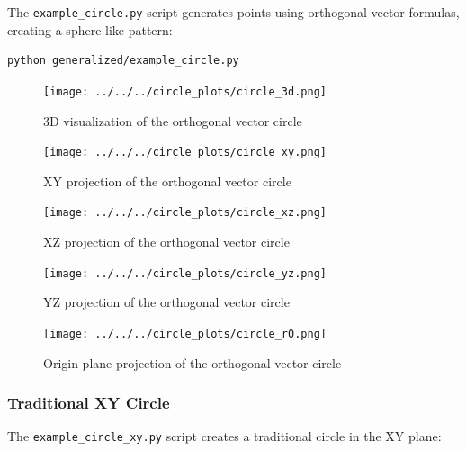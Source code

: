 The \texttt{example\_circle.py} script generates points using orthogonal vector formulas, creating a sphere-like pattern:

\begin{lstlisting}[language=bash]
python generalized/example_circle.py
\end{lstlisting}

\begin{figure}[H]
    \centering
    \texttt{[image: ../../../circle\_plots/circle\_3d.png]}
    \caption{3D visualization of the orthogonal vector circle}
    \label{fig:example_circle_3d}
\end{figure}

\begin{figure}[H]
    \centering
    \begin{minipage}{0.48\textwidth}
        \centering
        \texttt{[image: ../../../circle\_plots/circle\_xy.png]}
        \caption{XY projection of the orthogonal vector circle}
        \label{fig:example_circle_xy}
    \end{minipage}\hfill
    \begin{minipage}{0.48\textwidth}
        \centering
        \texttt{[image: ../../../circle\_plots/circle\_xz.png]}
        \caption{XZ projection of the orthogonal vector circle}
        \label{fig:example_circle_xz}
    \end{minipage}
\end{figure}

\begin{figure}[H]
    \centering
    \begin{minipage}{0.48\textwidth}
        \centering
        \texttt{[image: ../../../circle\_plots/circle\_yz.png]}
        \caption{YZ projection of the orthogonal vector circle}
        \label{fig:example_circle_yz}
    \end{minipage}\hfill
    \begin{minipage}{0.48\textwidth}
        \centering
        \texttt{[image: ../../../circle\_plots/circle\_r0.png]}
        \caption{Origin plane projection of the orthogonal vector circle}
        \label{fig:example_circle_origin}
    \end{minipage}
\end{figure}

\subsubsection{Traditional XY Circle}

The \texttt{example\_circle\_xy.py} script creates a traditional circle in the XY plane:

